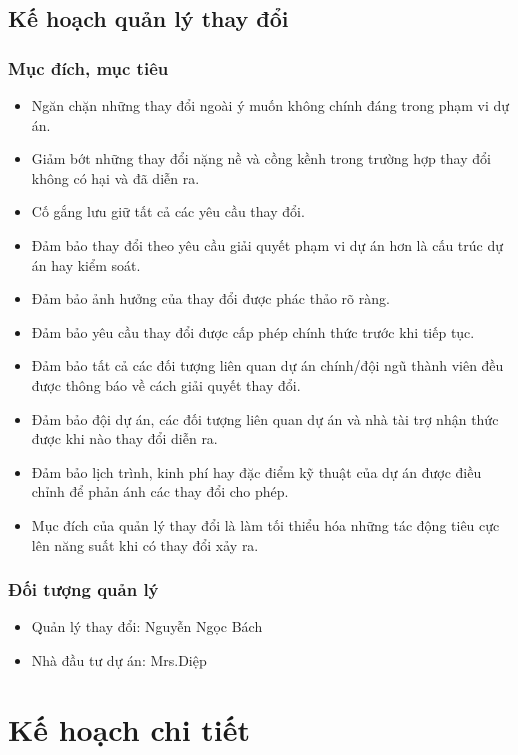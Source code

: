 \documentclass[12pt]{article}
\begin{document}
\subsection{Kế hoạch quản lý thay đổi}
\subsubsection{Mục đích, mục tiêu}
\begin{itemize}[label=-, leftmargin=1cm]
    \item Ngăn chặn những thay đổi ngoài ý muốn không chính đáng trong phạm vi dự án.
    \item Giảm bớt những thay đổi nặng nề và cồng kềnh trong trường hợp thay đổi không có hại và đã diễn ra.
    \item Cố gắng lưu giữ tất cả các yêu cầu thay đổi.
    \item Đảm bảo thay đổi theo yêu cầu giải quyết phạm vi dự án hơn là cấu trúc dự án hay kiểm soát.
    \item Đảm bảo ảnh hưởng của thay đổi được phác thảo rõ ràng.
    \item Đảm bảo yêu cầu thay đổi được cấp phép chính thức trước khi tiếp tục.
    \item Đảm bảo tất cả các đối tượng liên quan dự án chính/đội ngũ thành viên đều được thông báo về cách giải quyết thay đổi.
    \item Đảm bảo đội dự án, các đối tượng liên quan dự án và nhà tài trợ nhận thức được khi nào thay đổi diễn ra.
    \item Đảm bảo lịch trình, kinh phí hay đặc điểm kỹ thuật của dự án được điều chỉnh để phản ánh các thay đổi cho phép.
    \item Mục đích của quản lý thay đổi là làm tối thiểu hóa những tác động tiêu cực lên năng suất khi có thay đổi xảy ra.
\end{itemize}

\subsubsection{Đối tượng quản lý}
\begin{itemize}[label=-, leftmargin=1cm]
    \item Quản lý thay đổi: Nguyễn Ngọc Bách
    \item Nhà đầu tư dự án: Mrs.Diệp
\end{itemize}

\section{Kế hoạch chi tiết}
\end{document}

